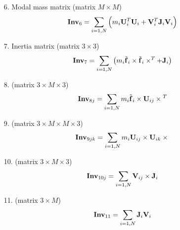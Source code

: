 \begin{enumerate}
\item[6.] Modal mass matrix
(matrix $M\times{M}$)
\begin{equation}
	\bm{\mathbf{Inv}}_6 = \sum_{i=1,N} \left( 
		m_i \bm{\mathbf{U}}_i^T \bm{\mathbf{U}}_i
		+ \bm{\mathbf{V}}_i^T \bm{\mathbf{J}}_i \bm{\mathbf{V}}_i
	 \right)
\end{equation}

\item[7.] Inertia matrix
(matrix $3\times{3}$)
\begin{equation}
	\bm{\mathbf{Inv}}_7 = \sum_{i=1,N} \left( 
		m_i \tilde{\bm{\mathbf{f}}}_i \times \tilde{\bm{\mathbf{f}}}_i \times^T + \bm{\mathbf{J}}_i
	 \right)
\end{equation}

\item[8.]
(matrix $3\times{M}\times{3}$)
\begin{equation}
	\bm{\mathbf{Inv}}_{8j} =
		\sum_{i=1,N} m_i \tilde{\bm{\mathbf{f}}}_{i} \times \bm{\mathbf{U}}_{ij} \times{}^T
\end{equation}

\item[9.]
(matrix $3\times{M}\times{M}\times{3}$)
\begin{equation}
	\bm{\mathbf{Inv}}_{9jk} = \sum_{i=1,N} m_i \bm{\mathbf{U}}_{ij} \times \bm{\mathbf{U}}_{ik} \times{}
\end{equation}

\item[10.]
(matrix $3\times{M}\times{3}$)
\begin{equation}
	\bm{\mathbf{Inv}}_{10j} = \sum_{i=1,N} \bm{\mathbf{V}}_{ij}\times \bm{\mathbf{J}}_i
\end{equation}

\item[11.]
(matrix $3\times{M}$)
\begin{equation}
	\bm{\mathbf{Inv}}_{11} = \sum_{i=1,N} \bm{\mathbf{J}}_i \bm{\mathbf{V}}_i
\end{equation}

\end{enumerate}

